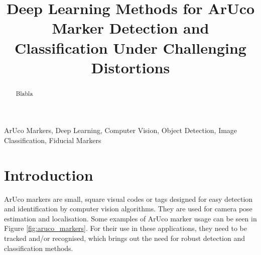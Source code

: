 \documentclass[conference]{IEEEtran}
\begin{document}
\title{Deep Learning Methods for ArUco Marker Detection and Classification Under Challenging Distortions}

\author{
}

\maketitle
\begin{abstract}

Blabla

\end{abstract}

\begin{IEEEkeywords}
ArUco Markers, Deep Learning, Computer Vision, Object Detection, Image Classification, Fiducial Markers
\end{IEEEkeywords}

\section{Introduction}

ArUco markers are small, square visual codes or tags designed for easy detection and identification by computer vision algorithms. They are used for camera pose
estimation and localisation. Some examples of ArUco marker usage can be seen in Figure \ref{fig:aruco_markers}. For their use in these applications, 
they need to be tracked and/or recognised, which brings out the need for robust detection and classification methods.
\end{document}
